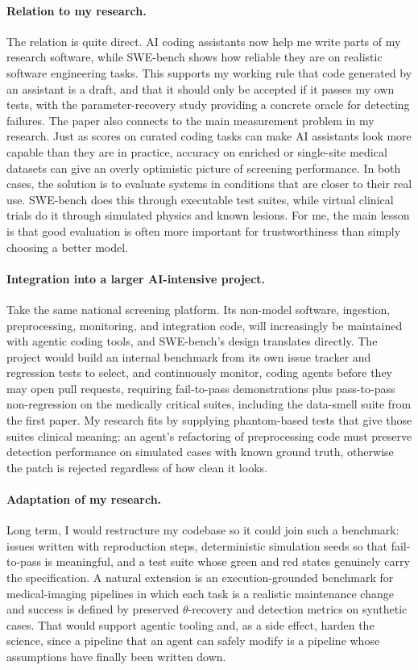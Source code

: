 \documentclass[11pt,a4paper]{article}
\begin{document}
\paragraph{Relation to my research.}
The relation is quite direct. AI coding assistants now help me write parts of my research software, while SWE-bench shows how reliable they are on realistic software engineering tasks. This supports my working rule that code generated by an assistant is a draft, and that it should only be accepted if it passes my own tests, with the parameter-recovery study providing a concrete oracle for detecting failures. The paper also connects to the main measurement problem in my research. Just as scores on curated coding tasks can make AI assistants look more capable than they are in practice, accuracy on enriched or single-site medical datasets can give an overly optimistic picture of screening performance. In both cases, the solution is to evaluate systems in conditions that are closer to their real use. SWE-bench does this through executable test suites, while virtual clinical trials do it through simulated physics and known lesions. For me, the main lesson is that good evaluation is often more important for trustworthiness than simply choosing a better model.

\paragraph{Integration into a larger AI-intensive project.}
Take the same national screening platform. Its non-model software, ingestion, preprocessing, monitoring, and integration code, will increasingly be maintained with agentic coding tools, and SWE-bench's design translates directly. The project would build an internal benchmark from its own issue tracker and regression tests to select, and continuously monitor, coding agents before they may open pull requests, requiring fail-to-pass demonstrations plus pass-to-pass non-regression on the medically critical suites, including the data-smell suite from the first paper. My research fits by supplying phantom-based tests that give those suites clinical meaning: an agent's refactoring of preprocessing code must preserve detection performance on simulated cases with known ground truth, otherwise the patch is rejected regardless of how clean it looks.

\paragraph{Adaptation of my research.}
Long term, I would restructure my codebase so it could join such a benchmark: issues written with reproduction steps, deterministic simulation seeds so that fail-to-pass is meaningful, and a test suite whose green and red states genuinely carry the specification. A natural extension is an execution-grounded benchmark for medical-imaging pipelines in which each task is a realistic maintenance change and success is defined by preserved $\theta$-recovery and detection metrics on synthetic cases. That would support agentic tooling and, as a side effect, harden the science, since a pipeline that an agent can safely modify is a pipeline whose assumptions have finally been written down.
\end{document}

